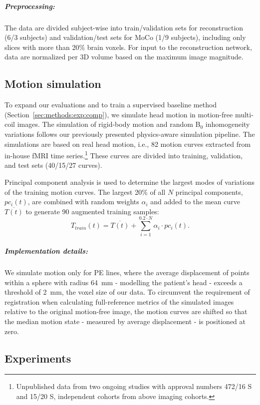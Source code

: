 \documentclass[AMA,STIX2COL]{MRM}
\begin{document}
\subparagraph{Preprocessing:} \label{sec:methods:data:preproc}
The data are divided subject-wise into  train/validation sets for reconstruction (6/3 subjects) and validation/test sets for MoCo (1/9 subjects), including only slices with more than 20\% brain voxels. 
For input to the reconstruction network, data are normalized per 3D volume based on the maximum image magnitude.



\subsection{Motion simulation} \label{sec:methods:simulation}
To expand our evaluations and to train a supervised baseline method (Section~\ref{sec:methods:exp:comp}), we simulate head motion in motion-free multi-coil images. The simulation of rigid-body motion and random B$_0$ inhomogeneity variations follows our previously presented physics-aware simulation pipeline.\cite{Eichhorn_2023} The simulations are based on real head motion, i.e., 82 motion curves extracted from in-house fMRI time series.\footnote{Unpublished data from two ongoing studies with approval numbers
472/16 S and 15/20 S, independent cohorts from above imaging cohorts.}
These curves are divided into training, validation, and test sets (40/15/27 curves).

Principal component analysis is used to determine the largest modes of variations of
the training motion curves. The largest 20\% of all $N$ principal components, $pc_i(t)$, are combined with random weights $\alpha_i$
and added to the mean curve $\overline{T(t)}$ to generate 90 augmented training samples:~\cite{Cootes_1995}
\begin{equation}
    T_{train}(t) = \overline{T(t)} + \sum_{i=1}^{0.2\cdot N} \alpha_i \cdot pc_i(t).
\end{equation}

\subparagraph{Implementation details:} \label{sec:methods:simulation:details}
We simulate motion only for PE lines, where the average displacement of points within a sphere with radius 64~mm - modelling the patient's head - exceeds a threshold of 2~mm, the voxel size of our data. To circumvent the requirement of registration when calculating full-reference metrics of the simulated images relative to the original motion-free image, the motion curves are shifted so that the median motion state - measured by average displacement - is positioned at zero.


\subsection{Experiments} \label{sec:methods:exp}
\end{document}
